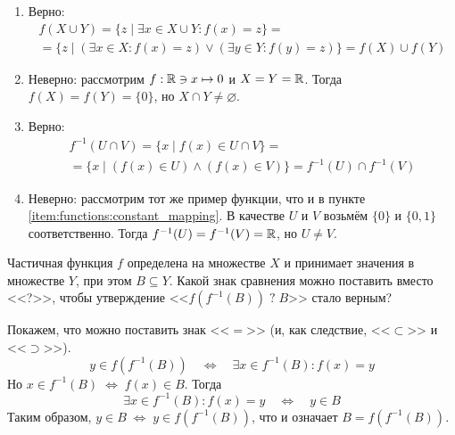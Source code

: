 \begin{Answer}
    \noindent
    \begin{enumerate}[label=\textbf{\alph*)}]
        \item
            Верно:
            \begin{multline*}
                f(X \cup Y) = \{ z \mid \exists x \in X \cup Y: f(x) = z \} = \\
                = \{z \mid \left(\exists x \in X: f(x) = z \right) \vee \left( \exists y \in Y: f(y) = z \right) \} = f(X) \cup f(Y)
            \end{multline*}
        \item
            \label{item:functions:constant_mapping}
            Неверно: рассмотрим $ f: \mathbb{R} \ni x \mapsto 0 $ и $ X = Y = \mathbb{R} $.
            Тогда $ f(X) = f(Y) = \{ 0 \} $, но $ X \cap Y \neq \varnothing $.
        \item
            Верно:
            \begin{multline*}
                f^{-1}(U \cap V) = \{ x \mid f(x) \in U \cap V \} = \\
                = \{x \mid (f(x) \in U) \wedge (f(x) \in V) \} = f^{-1}(U) \cap f^{-1}(V)
            \end{multline*}
        \item
            Неверно: рассмотрим тот же пример функции, что и в пункте \ref{item:functions:constant_mapping}.
            В качестве $ U $ и $ V $ возьмём $ \{0\} $ и $ \{0, 1\} $ соответственно.
            Тогда $ f^{-1}(U) = f^{-1}(V) = \mathbb{R} $, но $ U \neq V $.
    \end{enumerate}
\end{Answer}


\begin{Exercise}[counter=SecExercise, label={exercise:functions:map_unmap}]
    \noindent
    Частичная функция $ f $ определена на множестве $ X $ и принимает
    значения в множестве $ Y $, при этом $ B \subseteq Y $.
    Какой знак сравнения можно поставить вместо <<?>>, чтобы утверждение <<$ f (f^{-1}(B)) \; ? \; B $>> стало верным?
\end{Exercise}

\begin{Answer}
    \noindent
    Покажем, что можно поставить знак <<$ = $>>
    (и, как следствие, <<$ \subset $>> и <<$ \supset $>>).
    \[
        y \in f(f^{-1}(B)) \quad \Longleftrightarrow \quad \exists x \in f^{-1}(B): f(x) = y
    \]
    Но $ x \in f^{-1}(B) \; \Longleftrightarrow \; f(x) \in B $.
    Тогда
    \[
        \exists x \in f^{-1}(B): f(x) = y \quad \Longleftrightarrow \quad y \in B
    \]
    Таким образом, $ y \in B \; \Longleftrightarrow \; y \in f(f^{-1}(B)) $,
    что и означает $ B = f(f^{-1}(B)) $.
\end{Answer}

